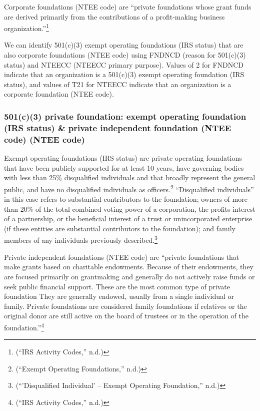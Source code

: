 \documentclass[
  letterpaper,
  DIV=11,
  numbers=noendperiod]{scrreprt}
\begin{document}
Corporate foundations (NTEE code) are ``private foundations whose grant
funds are derived primarily from the contributions of a profit-making
business organization.''\footnote{({``IRS Activity Codes,''} n.d.)}

We can identify 501(c)(3) exempt operating foundations (IRS status) that
are also corporate foundations (NTEE code) using FNDNCD (reason for
501(c)(3) status) and NTEECC (NTEECC primary purpose). Values of 2 for
FNDNCD indicate that an organization is a 501(c)(3) exempt operating
foundation (IRS status), and values of T21 for NTEECC indicate that an
organization is a corporate foundation (NTEE code).

\hypertarget{c3-private-foundation-exempt-operating-foundation-irs-status-private-independent-foundation-ntee-code-ntee-code}{%
\subsubsection{501(c)(3) private foundation: exempt operating foundation
(IRS status) \& private independent foundation (NTEE code) (NTEE
code)}\label{c3-private-foundation-exempt-operating-foundation-irs-status-private-independent-foundation-ntee-code-ntee-code}}

Exempt operating foundations (IRS status) are private operating
foundations that have been publicly supported for at least 10 years,
have governing bodies with less than 25\% disqualified individuals and
that broadly represent the general public, and have no disqualified
individuals as officers.\footnote{({``Exempt Operating Foundations,''}
  n.d.)} ``Disqualified individuals'' in this case refers to substantial
contributors to the foundation; owners of more than 20\% of the total
combined voting power of a corporation, the profits interest of a
partnership, or the beneficial interest of a trust or unincorporated
enterprise (if these entities are substantial contributors to the
foundation); and family members of any individuals previously
described.\footnote{({``'Disqualified Individual' -- Exempt Operating
  Foundation,''} n.d.)}

Private independent foundations (NTEE code) are ``private foundations
that make grants based on charitable endowments. Because of their
endowments, they are focused primarily on grantmaking and generally do
not actively raise funds or seek public financial support. These are the
most common type of private foundation They are generally endowed,
usually from a single individual or family. Private foundations are
considered family foundations if relatives or the original donor are
still active on the board of trustees or in the operation of the
foundation.''\footnote{({``IRS Activity Codes,''} n.d.)}
\end{document}
